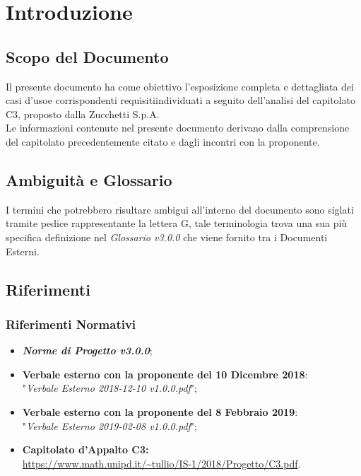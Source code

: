\section{Introduzione}\label{Intro}

\subsection{Scopo del Documento}
Il presente documento ha come obiettivo l'esposizione completa e dettagliata dei casi d'uso\glossario e corrispondenti requisiti\glossario individuati a seguito dell'analisi del capitolato C3, proposto dalla Zucchetti S.p.A.\\
Le informazioni contenute nel presente documento derivano dalla comprensione del capitolato precedentemente citato e dagli incontri con la proponente.

\subsection{Ambiguità e Glossario}
I termini che potrebbero risultare ambigui all'interno del documento sono siglati tramite pedice rappresentante la lettera \textmd{G}, tale terminologia trova una sua più specifica definizione nel \textit{Glossario v3.0.0} che viene fornito tra i Documenti Esterni.

\subsection{Riferimenti}\label{Riferimenti}
\subsubsection{Riferimenti Normativi}
\label{RN}
\begin{itemize}
\item \textbf{\textit{Norme di Progetto v3.0.0}};
\item \textbf{Verbale esterno con la proponente del 10 Dicembre 2018}: \-\\ "\textit{Verbale Esterno 2018-12-10 v1.0.0.pdf}";
\item \textbf{Verbale esterno con la proponente del 8 Febbraio 2019}: \-\\ "\textit{Verbale Esterno 2019-02-08 v1.0.0.pdf}";
\item \textbf{Capitolato d'Appalto C3:}\\ \url{https://www.math.unipd.it/~tullio/IS-1/2018/Progetto/C3.pdf}.
\end{itemize}

